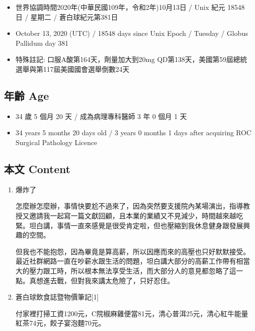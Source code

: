 \documentclass[
]{article}
\providecommand{\tightlist}{%
  \setlength{\itemsep}{0pt}\setlength{\parskip}{0pt}}
\begin{document}
\begin{itemize}
\tightlist
\item
  世界協調時間2020年(中華民國109年，令和2年)10月13日 / Unix 紀元 18548
  日 / 星期二 / 蒼白球紀元第381日
\item
  October 13, 2020 (UTC) / 18548 days since Unix Epoch / Tuesday /
  Globus Pallidum day 381
\item
  特殊註記: 口服A酸第164天，劑量加大到20mg
  QD第138天，美國第59屆總統選舉與第117屆美國國會選舉倒數24天
\end{itemize}

\hypertarget{ux5e74ux9f61-age-39}{%
\subsection{年齡 Age}\label{ux5e74ux9f61-age-39}}

\begin{itemize}
\tightlist
\item
  34 歲 5 個月 20 天 / 成為病理專科醫師 3 年 0 個月 1 天
\item
  34 years 5 months 20 days old / 3 years 0 months 1 days after
  acquiring ROC Surgical Pathology Licence
\end{itemize}

\hypertarget{ux672cux6587-content-39}{%
\subsection{本文 Content}\label{ux672cux6587-content-39}}

\begin{enumerate}
\def\labelenumi{\arabic{enumi}.}
\item
  爆炸了

  怎麼辦怎麼辦，事情快要尬不過來了，因為突然要支援院內某場演出，指導教授又邀請我一起寫一篇文獻回顧，且本業的業績又不見減少，時間越來越吃緊。坦白講，事情一直來感覺是很受肯定啦，但也壓縮到我休息健身跟發展興趣的空間。

  但我也不能抱怨，因為畢竟是算高薪，所以因應而來的高壓也只好默默接受。最近社群網路一直在吵薪水跟生活的問題，坦白講大部分的高薪工作帶有相當大的壓力跟工時，所以根本無法享受生活，而大部分人的意見都忽略了這一點。真想進去戰，但對我來講太危險了，只好忍住。
\item
  蒼白球飲食誌暨物價筆記{[}1{]}

  付家裡打掃工資1200元，C院椒麻雞便當81元，清心普洱25元，清心紅牛能量紅茶74元，餃子宴泡麵70元。
\end{enumerate}
\end{document}
